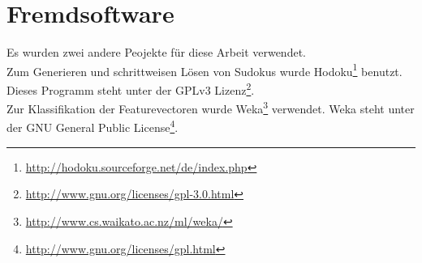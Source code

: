 \section{Fremdsoftware}
Es wurden zwei andere Peojekte für diese Arbeit verwendet.\\
Zum Generieren und schrittweisen Lösen von Sudokus wurde Hodoku\footnote{\url{http://hodoku.sourceforge.net/de/index.php}} benutzt. Dieses Programm steht unter der GPLv3 Lizenz\footnote{\url{http://www.gnu.org/licenses/gpl-3.0.html}}.\\
Zur Klassifikation der Featurevectoren wurde Weka\footnote{\url{http://www.cs.waikato.ac.nz/ml/weka/}} verwendet. Weka steht unter der GNU General Public License\footnote{\url{http://www.gnu.org/licenses/gpl.html}}.